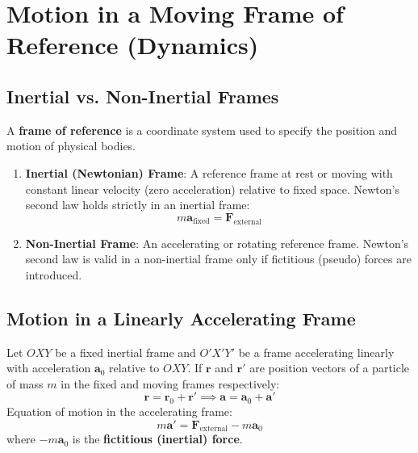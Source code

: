 \chapter{Motion in a Moving Frame of Reference (Dynamics)}

\section{Inertial vs. Non-Inertial Frames}

\begin{defbox}
A \textbf{frame of reference} is a coordinate system used to specify the position and motion of physical bodies.
\begin{enumerate}[leftmargin=1.5em]
    \item \textbf{Inertial (Newtonian) Frame}: A reference frame at rest or moving with constant linear velocity (zero acceleration) relative to fixed space. Newton's second law holds strictly in an inertial frame:
    \begin{equation}
        m \mathbf{a}_{\text{fixed}} = \mathbf{F}_{\text{external}}
    \end{equation}
    \item \textbf{Non-Inertial Frame}: An accelerating or rotating reference frame. Newton's second law is valid in a non-inertial frame only if fictitious (pseudo) forces are introduced.
\end{enumerate}
\end{defbox}

\section{Motion in a Linearly Accelerating Frame}

Let $OXY$ be a fixed inertial frame and $O'X'Y'$ be a frame accelerating linearly with acceleration $\mathbf{a}_0$ relative to $OXY$.
If $\mathbf{r}$ and $\mathbf{r}'$ are position vectors of a particle of mass $m$ in the fixed and moving frames respectively:
\begin{equation}
    \mathbf{r} = \mathbf{r}_0 + \mathbf{r}' \implies \mathbf{a} = \mathbf{a}_0 + \mathbf{a}'
\end{equation}
Equation of motion in the accelerating frame:
\begin{equation}
    m \mathbf{a}' = \mathbf{F}_{\text{external}} - m \mathbf{a}_0
\end{equation}
where $-m \mathbf{a}_0$ is the \textbf{fictitious (inertial) force}.

